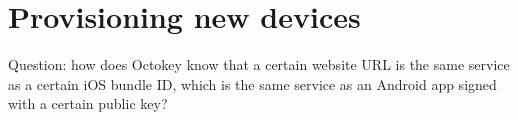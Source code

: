 \section{Provisioning new devices}

Question: how does Octokey know that a certain website URL is the same service as a certain iOS
bundle ID, which is the same service as an Android app signed with a certain public key?
